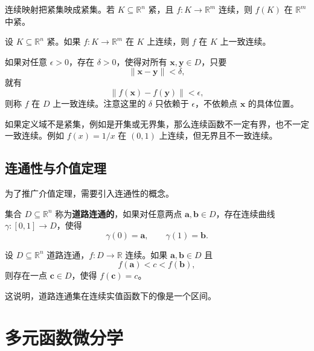 \begin{theorem}[紧性与连续映射]
连续映射把紧集映成紧集。若 $K\subseteq\mathbb{R}^n$ 紧，且 $f:K\to\mathbb{R}^m$ 连续，则 $f(K)$ 在 $\mathbb{R}^m$ 中紧。
\end{theorem}

\begin{theorem}[一致连续性]
设 $K\subseteq\mathbb{R}^n$ 紧。如果 $f:K\to\mathbb{R}^m$ 在 $K$ 上连续，则 $f$ 在 $K$ 上一致连续。
\end{theorem}

\begin{definition}[一致连续]
如果对任意 $\epsilon>0$，存在 $\delta>0$，使得对所有 $\mathbf{x},\mathbf{y}\in D$，只要
\[
    \|\mathbf{x}-\mathbf{y}\|<\delta,
\]
就有
\[
    \|f(\mathbf{x})-f(\mathbf{y})\|<\epsilon,
\]
则称 $f$ 在 $D$ 上一致连续。注意这里的 $\delta$ 只依赖于 $\epsilon$，不依赖点 $\mathbf{x}$ 的具体位置。
\end{definition}

\begin{remark}
如果定义域不是紧集，例如是开集或无界集，那么连续函数不一定有界，也不一定一致连续。例如 $f(x)=1/x$ 在 $(0,1)$ 上连续，但无界且不一致连续。
\end{remark}

\subsection{连通性与介值定理}

为了推广介值定理，需要引入连通性的概念。

\begin{definition}[道路连通集]
集合 $D\subseteq\mathbb{R}^n$ 称为\textbf{道路连通的}，如果对任意两点 $\mathbf{a},\mathbf{b}\in D$，存在连续曲线 $\gamma:[0,1]\to D$，使得
\[
    \gamma(0)=\mathbf{a},\qquad \gamma(1)=\mathbf{b}.
\]
\end{definition}

\begin{theorem}[广义介值定理]
设 $D\subseteq\mathbb{R}^n$ 道路连通，$f:D\to\mathbb{R}$ 连续。如果 $\mathbf{a},\mathbf{b}\in D$ 且
\[
    f(\mathbf{a})<c<f(\mathbf{b}),
\]
则存在一点 $\mathbf{c}\in D$，使得 $f(\mathbf{c})=c$。
\end{theorem}

这说明，道路连通集在连续实值函数下的像是一个区间。


\section{多元函数微分学}

